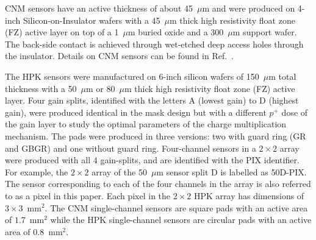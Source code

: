 \documentclass[preprint,1p]{elsarticle}
\begin{document}
CNM sensors have an active thickness of about 45~$\mu$m and were
produced on 4-inch Silicon-on-Insulator wafers with a 45~$\mu$m thick high
resistivity float zone (FZ) active layer on top of a 1~$\mu$m buried oxide and a
300~$\mu$m support wafer. The back-side contact is achieved through wet-etched deep
access holes through the insulator. Details on CNM sensors can be found in
Ref.~\cite{CNMSensors, Cartiglia201783}. 

The HPK sensors were manufactured on 6-inch silicon wafers of 150~$\mu$m total
thickness with a 50~$\mu$m or 80~$\mu$m thick high resistivity float zone (FZ)
active layer. Four gain splits, identified with the letters A (lowest gain) to D
(highest gain), were produced identical in the mask design but with a different
$p^+$ dose of the gain layer to study the optimal parameters of the charge
multiplication mechanism. The pads were produced in three versions: two with
guard ring (GR and GBGR) and one without guard ring. Four-channel sensors in a $2\times 2$
array were produced with all 4 gain-splits, and are identified with the PIX
identifier. For example, the $2\times 2$ array of the 50~$\mu$m sensor split D is labelled as
50D-PIX. The sensor corresponding to each of the four channels in the array 
is also referred to as a pixel in this paper. 
Each pixel in the $2\times 2$ HPK array has dimensions of $3\times 3$~$\mathrm{mm}^{2}$. 
The CNM single-channel sensors are square pads with an active area of $1.7$~$\mathrm{mm}^{2}$ 
while the HPK single-channel sensors are circular pads with an active area of $0.8$~$\mathrm{mm}^{2}$.
\end{document}
